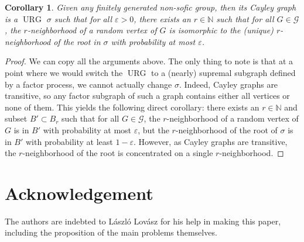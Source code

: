 \documentclass[12pt,a4paper]{article}
\newtheorem{Corollary}[Theorem]{Corollary}
\newcommand{\eps}{\varepsilon}
\newcommand{\G}{\mathcal{G}}
\newcommand{\N}{\mathbb{N}}
\renewcommand{\:}{\colon}
\DeclareMathOperator{\URG}{URG}
\begin{document}
\begin{Corollary}
Given any finitely generated non-sofic group, then its Cayley graph is a $\URG$ $\sigma$ such that for all $\eps > 0$, there exists an $r \in \N$ such that for all $G \in \G$, the $r$-neighborhood of a random vertex of $G$ is isomorphic to the (unique) $r$-neighborhood of the root in $\sigma$ with probability at most $\eps$.
\end{Corollary}
\begin{proof}
We can copy all the arguments above. 
The only thing to note is that at a point where we would switch the $\URG$ to a (nearly) supremal subgraph defined by a factor process, we cannot actually change $\sigma$. 
Indeed, Cayley graphs are transitive, so any factor subgraph of such a graph contains either all vertices or none of them. 
This yields the following direct corollary: 
there exists an $r \in \N$ and subset $B' \subset B_r$ such that for all $G \in \G$, the $r$-neighborhood of a random vertex of $G$ is in $B'$ with probability at most $\eps$, but the $r$-neighborhood of the root of $\sigma$ is in $B'$ with probability at least $1 - \eps$. 
However, as Cayley graphs are transitive, the $r$-neighborhood of the root is concentrated on a single $r$-neighborhood. 
\end{proof}

\section{Acknowledgement}

The authors are indebted to L\'aszl\'o Lov\'asz for his help in making this paper, including the proposition of the main problems themselves.




\end{document}
